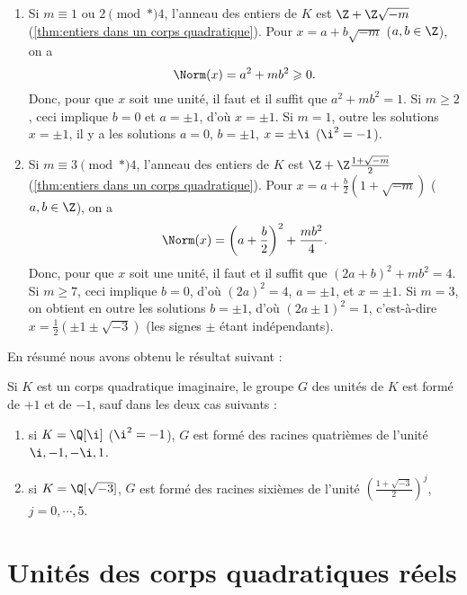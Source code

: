 \documentclass[11pt, useosf,
  title in boldface,
  theorem in new line,
  theorem numbering = section,
  number theorems separately,
]{simplivre}
\begin{document}
    \begin{enumerate}
        \item Si \( m \equiv 1 \) ou \( 2 \pmod*{4} \), l'anneau des entiers de \( K \) est \( \Z + \Z\sqrt{-m} \) (\cref{thm:entiers dans un corps quadratique}). Pour \( x = a + b\sqrt{-m} \) (\( a,b \in \Z \)), on a
        \[
            \Norm(x) = a^2 + m b^2 \geqslant 0.
        \]
        Donc, pour que \( x \) soit une unité, il faut et il suffit que \( a^2+mb^2 = 1 \). Si \( m \geqslant 2 \), ceci implique \( b = 0 \) et \( a = \pm 1 \), d'où \( x = \pm 1 \). Si \( m=1 \), outre les solutions \( x = \pm 1 \), il y a les solutions \( a = 0 \), \( b = \pm 1 \), \( x = \pm \i \) (\( \i^2 = -1 \)).
        \item Si \( m \equiv 3 \pmod*{4} \), l'anneau des entiers de \( K \) est \( \Z + \Z\frac{1+\sqrt{-m}}{2} \) (\cref{thm:entiers dans un corps quadratique}). Pour \( x = a + \frac{b}{2}(1+\sqrt{-m}) \) (\( a,b \in \Z \)), on a
        \vspace{-.2\baselineskip}%
        \[
            \Norm(x) = \left(a+\frac{b}{2}\right)^2 + \frac{m b^2}{4}.
        \]
        Donc, pour que \( x \) soit une unité, il faut et il suffit que \( (2a+b)^2+mb^2 = 4 \). Si \( m \geqslant 7 \), ceci implique \( b = 0 \), d'où \( (2a)^2 = 4 \), \( a = \pm 1 \), et \( x = \pm 1 \). Si \( m=3 \), on obtient en outre les solutions \( b = \pm 1 \), d'où \( (2a \pm 1)^2 = 1 \), c'est-à-dire \( x = \frac{1}{2}(\pm 1 \pm \sqrt{-3}) \) (les signes \( \pm \) étant indépendants).
    \end{enumerate}

    En résumé nous avons obtenu le résultat suivant :
    \begin{proposition}
        Si \( K \) est un corps quadratique imaginaire, le groupe \( G \) des unités de \( K \) est formé de \( +1 \) et de \( -1 \), sauf dans les deux cas suivants :
        \begin{enumerate}
            \item si \( K = \Q[\i] \) (\( \i^2 = -1 \)), \( G \) est formé des racines quatrièmes de l'unité \( \i, -1, -\i, 1 \).
            \item si \( K = \Q[\sqrt{-3}] \), \( G \) est formé des racines sixièmes de l'unité \( \left(\frac{1+\sqrt{-3}}{2}\right)^j \), \( j = 0, \cdots, 5 \).
        \end{enumerate}
    \end{proposition}

\enlargethispage*{\baselineskip}
\section{Unités des corps quadratiques réels}
\end{document}

